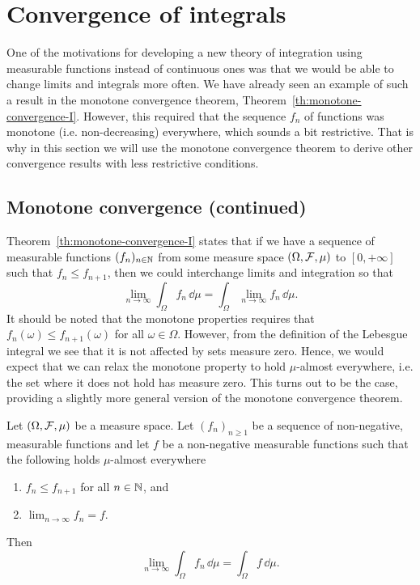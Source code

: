   

\section{Convergence of integrals}

One of the motivations for developing a new theory of integration using measurable functions instead of continuous ones was that we would be able to change limits and integrals more often. We have already seen an example of such a result in the monotone convergence theorem, Theorem~\ref{th:monotone-convergence-I}. However, this required that the sequence $f_n$ of functions was monotone (i.e. non-decreasing) everywhere, which sounds a bit restrictive. That is why in this section we will use the monotone convergence theorem to derive other convergence results with less restrictive conditions.

\subsection{Monotone convergence (continued)}

Theorem~\ref{th:monotone-convergence-I} states that if we have a sequence of measurable functions $(f_n)_{n \in \mathbb N}$ from some measure space $(\Omega, \mathcal F, \mu)$ to $[0,+\infty]$ such that $f_n \le f_{n+1}$, then we could interchange limits and integration so that
\[
	\lim_{n \to \infty} \int_\Omega f_n \, \dd \mu = \int_\Omega \lim_{n \to \infty} f_n \, \dd \mu.
\]
It should be noted that the monotone properties requires that $f_n(\omega) \le f_{n+1}(\omega)$ for all $\omega \in \Omega$. However, from the definition of the Lebesgue integral we see that it is not affected by sets measure zero. Hence, we would expect that we can relax the monotone property to hold $\mu$-almost everywhere, i.e. the set where it does not hold has measure zero. This turns out to be the case, providing a slightly more general version of the monotone convergence theorem.

\begin{theorem}\label{thm:monotone_convergence_ii}
Let $(\Omega, \mathcal F, \mu)$ be a measure space. Let $(f_n)_{n \ge 1}$ be a sequence of non-negative, measurable functions and let $f$ be a non-negative measurable functions such that the following holds $\mu$-almost everywhere
\begin{enumerate}[label={(\arabic*)}]
	\item $f_n \le f_{n+1}$ for all $n \in \mathbb N$, and
	\item $\lim_{n \to \infty} f_n = f$.
\end{enumerate}
Then
\[
	\lim_{n \to \infty} \int_\Omega f_n \,\dd \mu = \int_\Omega f \,\dd \mu.
\]
\end{theorem}

